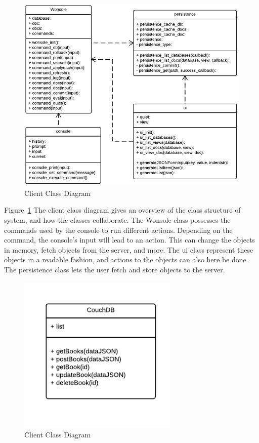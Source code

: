 \begin{figure}[h]
\centering
\includegraphics[width=6in]{image/architecture/clientClassDiagram.png}
\caption{Client Class Diagram}
\label{figure:clientClassDiagram}
\end{figure}

Figure~\ref{figure:clientClassDiagram} The client class diagram gives an overview of the class structure of system, and how the classes collaborate. The Wonsole class possesses the commands used by the console to run different actions. Depending on the command, the console's input will lead to an action. This can change the objects in memory, fetch objects from the server, and more. The ui class represent these objects in a readable fashion, and actions to the objects can also here be done. The persistence class lets the user fetch and store objects to the server.

\begin{figure}[h]
\centering
\includegraphics[width=3in]{image/architecture/serverClassDiagram.png}
\caption{Client Class Diagram}
\label{figure:serverClassDiagram}
\end{figure}

